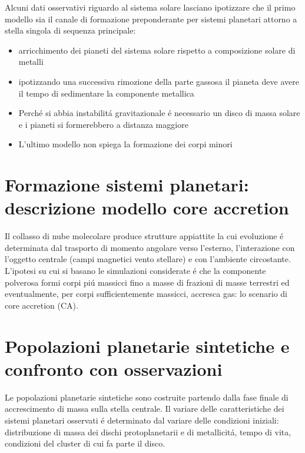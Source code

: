 \documentclass[twoside,11pt,fleqn]{memoir}%
\begin{document}
Alcuni dati osservativi riguardo al sistema solare lasciano ipotizzare che il primo modello sia il canale di formazione preponderante per sistemi planetari attorno a stella singola di sequenza principale:
\begin{itemize}
\item arricchimento dei pianeti del sistema solare rispetto a composizione solare di metalli%
\item ipotizzando una successiva rimozione della parte gassosa il pianeta deve avere il tempo di sedimentare la componente metallica
\item Perch\'e si abbia instabilit\'a gravitazionale \'e necessario un disco di massa solare e i pianeti si formerebbero a distanza maggiore
\item L'ultimo modello non spiega la formazione dei corpi minori
\end{itemize}


\cleartorecto

{\let\clearpage\relax\let\cleardoublepage\relax
\part{Formazione sistemi planetari: descrizione modello core accretion}\label{part:CAdesc}
}
Il collasso di nube molecolare produce strutture appiattite la cui evoluzione \'e determinata dal trasporto di momento angolare verso l'esterno, l'interazione con l'oggetto centrale (campi magnetici vento stellare) e con l'ambiente circostante.
L'ipotesi su cui si basano le simulazioni considerate \'e che la componente polverosa formi corpi pi\'u massicci fino a masse di frazioni di masse terrestri  ed eventualmente, per corpi sufficientemente massicci, accresca gas: lo scenario di core accretion (CA).

\cleartorecto

{\let\clearpage\relax\let\cleardoublepage\relax
\part{Popolazioni planetarie sintetiche e confronto con osservazioni}
}

Le popolazioni planetarie sintetiche sono costruite partendo dalla fase finale di accrescimento di massa sulla stella centrale. Il variare delle caratteristiche dei sistemi planetari osservati \'e determinato dal variare delle condizioni iniziali: distribuzione di massa dei dischi protoplanetarii e di metallicit\'a, tempo di vita, condizioni del cluster di cui fa parte il disco.
\end{document}
